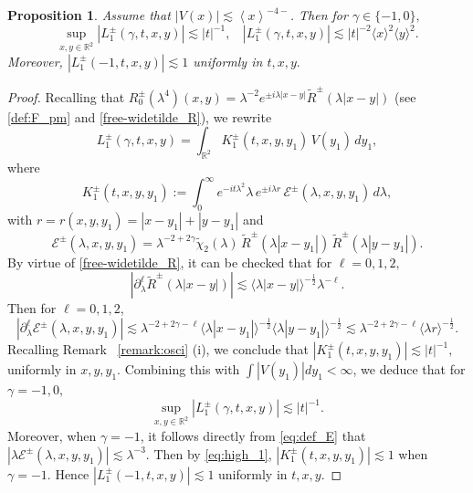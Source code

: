 \documentclass[reqno]{amsart}
\newtheorem{proposition}[theorem]{Proposition}
\numberwithin{equation}{section}
\begin{document}
\begin{proposition}\label{high_1}
Assume that $|V(x)| \lesssim \left \langle  x\right \rangle^{-4-}$. Then for $\gamma\in \{-1,0\},$
$$
\sup _{x, y \in \mathbb{R}^2}\left|L_{1}^{\pm}(\gamma,t,x,y)\right| \lesssim |t|^{-1}, \ \ \ \
\left|L_{1}^{\pm}(\gamma,t,x,y)\right| \lesssim |t|^{-2} \langle x \rangle^2 \langle y \rangle^2.
$$
Moreover, $|L_1^\pm(-1,t,x,y)|\lesssim 1$  uniformly in $t,x,y.$
\end{proposition}
\begin{proof}
Recalling that $R^\pm_0(\lambda^4)(x,y) = \lambda^{-2}e^{\pm i\lambda|x-y|}\widetilde{R}^\pm(\lambda|x-y|)$ (see \eqref{def:F_pm} and \eqref{free-widetilde_R}), we rewrite
\[
L_{1}^{\pm}(\gamma,t,x,y) = \int_{\mathbb{R}^2} K_1^\pm(t,x,y,y_1)\, V(y_1)\, dy_1,
\]
where
\begin{equation}\label{eq:high_1}
K_1^\pm(t,x,y,y_1):=\int_0^\infty e^{-it\lambda^2}\lambda\,e^{\pm i\lambda r}\, \mathcal{E}^\pm(\lambda, x, y,y_1)\, d\lambda,
\end{equation}
with $r=r(x,y,y_1)=|x-y_1|+|y-y_1|$ and
\begin{equation}\label{eq:def_E}
\mathcal{E}^\pm(\lambda,x,y,y_1) = \lambda^{-2+2\gamma}\widetilde{\chi}_2(\lambda)\,
\widetilde{R}^\pm(\lambda|x-y_1|)\,\widetilde{R}^\pm(\lambda|y-y_1|).
\end{equation}
By virtue of \eqref{free-widetilde_R}, it can be checked that for $\ell=0,1,2,$
$$
\left| \partial_\lambda^{\ell}  \widetilde{R}^\pm(\lambda|x-y|)  \right| \lesssim \langle \lambda |x-y| \rangle^{-\frac{1}{2}} \lambda^{-\ell}.
$$
Then for $\ell=0,1,2$,
\[
\left|\partial_\lambda^{\ell} \mathcal{E}^\pm(\lambda, x, y,y_1)\right|
\lesssim \lambda^{-2+2\gamma-\ell}\langle \lambda |x-y_1| \rangle^{-\frac{1}{2}}
\langle \lambda |y-y_1| \rangle^{-\frac{1}{2}}
\lesssim \lambda^{-2+2\gamma-\ell}\langle \lambda r\rangle^{-\frac{1}{2}}.
\]
Recalling Remark ~\ref{remark:osci} (i), we conclude that
$
|K_1^\pm(t,x,y,y_1)| \lesssim |t|^{-1},
$
uniformly in $x,y,y_1$. Combining this with $\int |V(y_1)| dy_1 < \infty$, 
we deduce that for $\gamma=-1,0,$
$$\sup_{x,y\in\mathbb{R}^2} |L_1^\pm(\gamma,t,x,y)| \lesssim |t|^{-1}.$$
Moreover,  when $\gamma=-1$, it follows directly from \eqref{eq:def_E} that \( |\lambda \mathcal{E}^{\pm}(\lambda,x,y,y_1) | \lesssim \lambda^{-3} \). Then by \eqref{eq:high_1}, \( |K_1^\pm(t,x,y,y_1)| \lesssim 1 \) when $\gamma=-1$. Hence $|L_1^\pm(-1,t,x,y)|\lesssim 1$  uniformly  in $t,x,y.$


\end{proof}
\end{document}
